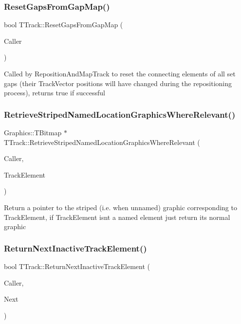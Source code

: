 \subsubsection{\texorpdfstring{Reset\+Gaps\+From\+Gap\+Map()}{ResetGapsFromGapMap()}}
{\footnotesize\ttfamily bool T\+Track\+::\+Reset\+Gaps\+From\+Gap\+Map (\begin{DoxyParamCaption}\item[{int}]{Caller }\end{DoxyParamCaption})}

Called by Reposition\+And\+Map\+Track to reset the connecting elements of all set gaps (their Track\+Vector positions will have changed during the repositioning process), returns true if successful \mbox{\label{class_t_track_a10027e5b78eb6dfdc246613d78aab53e}} 
\subsubsection{\texorpdfstring{Retrieve\+Striped\+Named\+Location\+Graphics\+Where\+Relevant()}{RetrieveStripedNamedLocationGraphicsWhereRelevant()}}
{\footnotesize\ttfamily Graphics\+::\+T\+Bitmap $\ast$ T\+Track\+::\+Retrieve\+Striped\+Named\+Location\+Graphics\+Where\+Relevant (\begin{DoxyParamCaption}\item[{int}]{Caller,  }\item[{\mbox{\hyperlink{class_t_track_element}{T\+Track\+Element}}}]{Track\+Element }\end{DoxyParamCaption})}

Return a pointer to the striped (i.\+e. when unnamed) graphic corresponding to Track\+Element, if Track\+Element isn\textquotesingle{}t a named element just return its normal graphic \mbox{\label{class_t_track_a58a2afacadd0f564b474ac0faabc88d4}} 
\subsubsection{\texorpdfstring{Return\+Next\+Inactive\+Track\+Element()}{ReturnNextInactiveTrackElement()}}
{\footnotesize\ttfamily bool T\+Track\+::\+Return\+Next\+Inactive\+Track\+Element (\begin{DoxyParamCaption}\item[{int}]{Caller,  }\item[{\mbox{\hyperlink{class_t_track_element}{T\+Track\+Element}} \&}]{Next }\end{DoxyParamCaption})}

